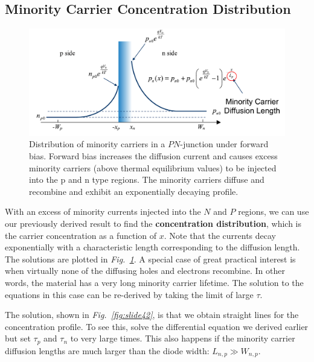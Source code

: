 \subsection{Minority Carrier Concentration Distribution}
\begin{figure}[t]
\centering
\includegraphics[width=.93\columnwidth]{slide41}
\caption{Distribution of minority carriers in a $PN$-junction under forward bias.  Forward bias increases the diffusion current and causes excess minority carriers (above thermal equilibrium values) to be injected into the p and n type regions.  The minority carriers diffuse and recombine and exhibit an exponentially decaying profile.}
\label{fig:slide41}
\end{figure}
With an excess of minority currents injected into the $N$ and $P$ regions, we can use our previously derived result to find the \textbf{concentration distribution}, which is the carrier concentration as a function of $x$.  Note that the currents decay exponentially with a characteristic length corresponding to the diffusion length.  The solutions are plotted in \emph{Fig.~\ref{fig:slide41}}.  A special case of great practical interest is when virtually none of the diffusing holes and electrons recombine.  In other words, the material has a very long minority carrier lifetime.  The solution to the equations in this case can be re-derived by taking the limit of large $\tau$.

The solution, shown in \emph{Fig.~\ref{fig:slide42}}, is that we obtain straight lines for the concentration profile.  To see this, solve the differential equation we derived earlier but set $\tau_p$ and $\tau_n$ to very large times.  This also happens if the minority carrier diffusion lengths are much larger than the diode width: $ {L_{n,p}} \gg {W_{n,p}} $.

